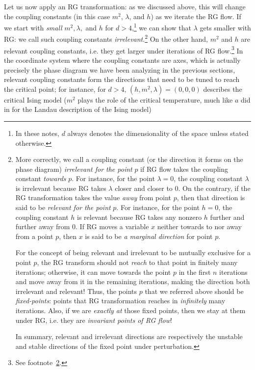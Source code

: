 \documentclass[12pt]{article}
\numberwithin{equation}{section}
\begin{document}
Let us now apply an RG transformation: as we discussed above, this will change the coupling constants (in this case $m^2$, $\lambda$, and $h$) as we iterate the RG flow. If we start with \emph{small} $m^2,\lambda,$ and $h$ for $d>4$,\footnote{In these notes, $d$ always denotes the dimensionality of the space unless stated otherwise.} we can show that $\lambda$ gets smaller with RG: we call such coupling constants \emph{irrelevant}.\footnote{\label{footnote: relevant vs irrelevant}More correctly, we call a coupling constant (or the direction it forms on the phase diagram) \emph{irrelevant for the point} $p$ if RG flow takes the coupling constant \emph{towards} $p$. For instance, for the point $\lambda=0$, the coupling constant $\lambda$ is irrelevant because RG takes $\lambda$ closer and closer to $0$. On the contrary, if the RG transformation takes the value \emph{away} from point $p$, then that direction is said to be \emph{relevant for the point }$p$. For instance, for the point $h=0$, the coupling constant $h$ is relevant because RG takes any nonzero $h$ further and further away from $0$. If RG moves a variable $x$ neither towards to nor away from a point $p$, then $x$ is said to be \emph{a marginal direction} for point $p$.

For the concept of being relevant and irrelevant to be mutually exclusive for a point $p$, the RG transform should not \emph{reach} to that point in finitely many iterations; otherwise, it can move towards the point $p$ in the first $n$ iterations and move away from it in the remaining iterations, making the direction both irrelevant and relevant! Thus, the points $p$ that we referred above should be \emph{fixed-points}: points that RG transformation reaches in \emph{infinitely} many iterations. Also, if we are \emph{exactly at} those fixed points, then we stay at them under RG, i.e. they are \emph{invariant points of RG flow}!


In summary, relevant and irrelevant directions are respectively the unstable and stable directions of the fixed point under perturbation.
} On the other hand, $m^2$ and $h$ are relevant coupling constants, i.e. they get larger under iterations of RG flow.\footnote{See footnote~\ref{footnote: relevant vs irrelevant}.} In the coordinate system where the coupling constants are axes, which is actually precisely the phase diagram we have been analyzing in the previous sections, relevant coupling constants form the directions that need to be tuned to reach the critical point; for instance, for $d>4$, $(h,m^2,\lambda)=(0,0,0)$ describes the critical Ising model ($m^2$ plays the role of the critical temperature, much like $a$ did in  for the Landau description of the Ising model)
\end{document}
